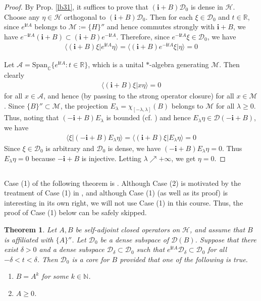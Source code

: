 \documentclass[12pt,b5paper,notitlepage]{article}
\theoremstyle{definition}
\theoremstyle{plain}
\newtheorem{thm}[df]{Theorem}
\newcommand{\mc}{\mathcal}
\newcommand{\Dom}{\scr{D}}
\newcommand{\Span}{\mathrm{Span}}
\newcommand{\bk}[1]{\langle {#1}\rangle}
\newcommand{\scr}{\mathscr}
\newcommand{\im}{\mathbf{i}}
\newcommand{\Cbb}{\mathbb C}
\newcommand{\Nbb}{\mathbb N}
\newcommand{\Rbb}{\mathbb R}
\numberwithin{equation}{section}
\begin{document}
\begin{proof}
By Prop. \ref{lb31}, it suffices to prove that $(\im+B)\Dom_0$ is dense in $\mc H$. Choose any $\eta\in\mc H$ orthogonal to $(\im+B)\Dom_0$. Then for each $\xi\in\Dom_0$ and $t\in\Rbb$, since $e^{\im tA}$ belongs to $\mc M:=\{H\}''$ and hence commutes strongly with $\im+B$, we have $e^{-\im tA}(\im+B)\subset(\im+B)e^{-\im tA}$. Therefore, since $e^{-\im tA}\xi\in\Dom_0$, we have
\begin{align*}
\bk{(\im+B)\xi|e^{\im tA}\eta}=\bk{(\im+B)e^{-\im tA}\xi|\eta}=0
\end{align*}

Let $\scr A=\Span_\Cbb\{e^{\im tA}:t\in\Rbb\}$, which is a unital $*$-algebra generating $\mc M$. Then clearly
\begin{align*}
\bk{(\im+B)\xi|x\eta}=0
\end{align*}
for all $x\in\scr A$, and hence (by passing to the strong operator closure) for all $x\in\mc M$. Since $\{B\}''\subset\mc M$, the projection $E_\lambda=\chi_{[-\lambda,\lambda]}(B)$ belongs to $\mc M$ for all $\lambda\geq0$. Thus, noting that $(-\im+B)E_\lambda$ is bounded (cf. \cite[Prop. 8.1]{Gui-S}) and hence $E_\lambda\eta\in\Dom(-\im+B)$, we have
\begin{align*}
\bk{\xi|(-\im+B)E_\lambda\eta}=\bk{(\im+B)\xi|E_\lambda\eta}=0
\end{align*}
Since $\xi\in\Dom_0$ is arbitrary and $\Dom_0$ is dense, we have $(-\im+B)E_\lambda\eta=0$. Thus $E_\lambda\eta=0$ because $-\im+B$ is injective. Letting $\lambda\nearrow+\infty$, we get $\eta=0$.
\end{proof}


\subsection{}

Case (1) of the following theorem is \cite[Lem.7.2]{CKLW18}. Although Case (2) is motivated by the treatment of Case (1) in \cite{CKLW18}, and although Case (1) (as well as its proof) is interesting in its own right, we will not use Case (1) in this course. Thus, the proof of Case (1) below can be safely skipped.

\begin{thm}\label{lb76}
Let $A,B$ be self-adjoint closed operators on $\mc H$, and assume that $B$ is affiliated with $\{A\}''$.  Let $\Dom_0$ be a dense subspace of $\Dom(B)$. Suppose that there exist $\delta>0$ and a dense subspace $\Dom_\delta\subset\Dom_0$ such that $e^{\im tA}\Dom_\delta\subset\Dom_0$ for all $-\delta<t<\delta$. Then $\Dom_0$ is a core for $B$ provided that one of the following is true.
\begin{enumerate}[label=(\arabic*)]
\item $B=A^k$ for some $k\in\Nbb$.
\item $A\geq0$.
\end{enumerate} 
\end{thm}
\end{document}
